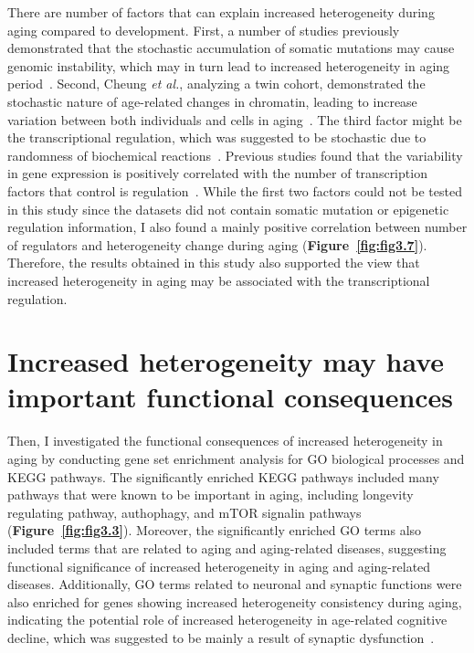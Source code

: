 There are number of factors that can explain increased heterogeneity during aging compared to development.
First, a number of studies previously demonstrated that the stochastic accumulation of somatic mutations may cause genomic instability,
which may in turn lead to increased heterogeneity in aging period~\cite{Lu2004, Vijg2004, Lodato2018, Lombard2005}.
Second, Cheung \textit{et al.}, analyzing a twin cohort, demonstrated the stochastic nature of age-related changes in chromatin,
leading to increase variation between both individuals and cells in aging~\cite{Cheung2018}.
The third factor might be the transcriptional regulation, which was suggested to be stochastic due to randomness of biochemical reactions~\cite{Maheshri2007, Barroso2018}.
Previous studies found that the variability in gene expression is positively correlated with the number of transcription factors that control is regulation~\cite{Barroso2018, Sharon2014}.
While the first two factors could not be tested in this study since the datasets did not contain somatic mutation or epigenetic regulation information, 
I also found a mainly positive correlation between number of regulators and heterogeneity change during aging (\textbf{Figure~\ref{fig:fig3.7}}).
Therefore, the results obtained in this study also supported the view that increased heterogeneity in aging may be associated with the transcriptional regulation.

\section{Increased heterogeneity may have important functional consequences}
Then, I investigated the functional consequences of increased heterogeneity in aging by conducting gene set enrichment analysis for GO biological processes and KEGG pathways.
The significantly enriched KEGG pathways included many pathways that were known to be important in aging,
including longevity regulating pathway, authophagy, and mTOR signalin pathways (\textbf{Figure~\ref{fig:fig3.3}}).
Moreover, the significantly enriched GO terms also included terms that are related to aging and aging-related diseases,
suggesting functional significance of increased heterogeneity in aging and aging-related diseases.
Additionally, GO terms related to neuronal and synaptic functions were also enriched for genes showing increased heterogeneity consistency during aging,
indicating the potential role of increased heterogeneity in age-related cognitive decline, which was suggested to be mainly a result of synaptic dysfunction~\cite{Morrison2012}.

